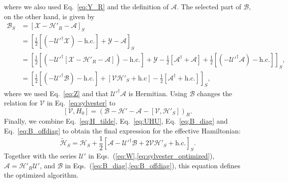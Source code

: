 %
where we also used Eq.~\eqref{eq:Y_R} and the definition of $\mathcal{A}$.
The selected part of $\mathcal{B}$, on the other hand, is given by
%
\begin{equation}
\label{eq:B_diag}
\begin{aligned}
  \mathcal{B}_{S} &= \left[\mathcal{X} - \mathcal{H}'_{R} - \mathcal{A}\right]_{S} \\
  &= \left[\frac{1}{2}[(-\mathcal{U}'^\dagger \mathcal{X})- \textrm{h.c.}] + \mathcal{Y} - \mathcal{A}\right]_{S} \\
  &= \left[\frac{1}{2}[(-\mathcal{U}'^\dagger [\mathcal{X} - \mathcal{H}'_{R} - \mathcal{A}])- \textrm{h.c.}]+ \mathcal{Y} - \frac{1}{2}[\mathcal{A}^\dagger + \mathcal{A} ] + {\frac{1}{2}[( - \mathcal{U}'^\dagger\mathcal{A} ) - \textrm{h.c.}]}\right]_{S}, \\
  &= \left[\frac{1}{2}[(-\mathcal{U}'^\dagger \mathcal{B})- \textrm{h.c.}]+ \left[\mathcal{V}\mathcal{H}'_{S} + \textrm{h.c}\right] - \frac{1}{2}[\mathcal{A}^\dagger + \textrm{h.c.} ]\right]_{S},
\end{aligned}
\end{equation}
%
where we used Eq.~\eqref{eq:Z} and that $\mathcal{U}'^\dagger \mathcal{A}$ is Hermitian.
%
Using $\mathcal{B}$ changes the relation for $\mathcal{V}$ in Eq.~\eqref{eq:sylvester} to
\begin{equation}
\label{eq:sylvester_optimized}
[\mathcal{V},H_0] = \left(\mathcal{B} - \mathcal{H}' - \mathcal{A} - [\mathcal{V}, \mathcal{H}'_{S}]\right)_{R}.
\end{equation}
Finally, we combine Eq.~\eqref{eq:H_tilde}, Eq.~\eqref{eq:UHU}, Eq.~\eqref{eq:B_diag} and Eq.~\eqref{eq:B_offdiag} to obtain the final expression for the effective Hamiltonian:
%
\begin{equation}
\label{eq:H_tilde_optimized}
\tilde{\mathcal{H}}_{S} = \mathcal{H}_{S} + \frac{1}{2}\left[\mathcal{A} - \mathcal{U}'^\dagger \mathcal{B} + 2\mathcal{V}\mathcal{H}'_{S} + \textrm{h.c.}\right]_{S}.
\end{equation}
Together with the series $\mathcal{U}'$ in Eqs.~(\ref{eq:W},\ref{eq:sylvester_optimized}), $\mathcal{A} = \mathcal{H}'_{R}\mathcal{U}'$, and $\mathcal{B}$ in Eqs.~(\ref{eq:B_diag},\ref{eq:B_offdiag}), this equation defines the optimized algorithm.
